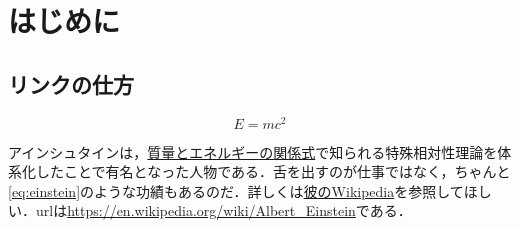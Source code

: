 
\section{はじめに}



\subsection{リンクの仕方}

\begin{equation}\label{eq:einstein}
  E = mc^2
\end{equation}

アインシュタインは，\hyperref[eq:einstein]{質量とエネルギーの関係式}で知られる特殊相対性理論を体系化したことで有名となった人物である．舌を出すのが仕事ではなく，ちゃんと\eqref{eq:einstein}のような功績もあるのだ．詳しくは\href{https://en.wikipedia.org/wiki/Albert_Einstein}{彼のWikipedia}を参照してほしい．urlは\url{https://en.wikipedia.org/wiki/Albert_Einstein}である．
